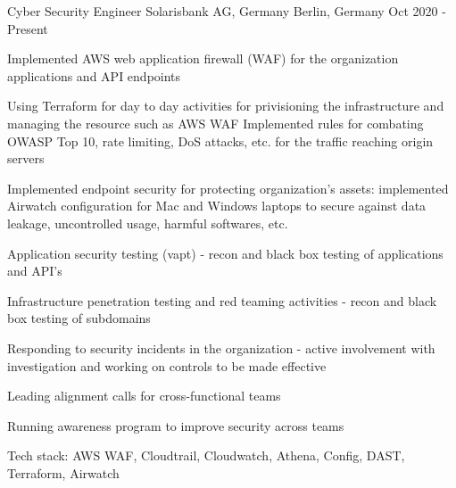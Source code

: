 \begin{cventries}
\cventry
    {Cyber Security Engineer} %
    {Solarisbank AG, Germany} %
    {Berlin, Germany} %
    {Oct 2020 - Present} %
    {
      \begin{cvitems} %
        \item {Implemented AWS web application firewall (WAF) for the organization applications and API endpoints
        \item Using Terraform for day to day activities for privisioning the infrastructure and managing the resource such as AWS WAF Implemented rules for combating OWASP Top 10, rate limiting, DoS attacks, etc. for the traffic reaching origin servers}
        \item {Implemented endpoint security for protecting organization's assets: implemented Airwatch configuration for Mac and Windows laptops to secure against data leakage, uncontrolled usage, harmful softwares, etc.}
        \item {Application security testing (vapt) - recon and black box testing of applications and API's}
        \item {Infrastructure penetration testing and red teaming activities  - recon and black box testing of subdomains}
        \item {Responding to security incidents in the organization - active involvement with investigation and working on controls to be made effective}
        \item {Leading alignment calls for cross-functional teams}
        \item {Running awareness program to improve security across teams}
        \item {Tech stack: AWS WAF, Cloudtrail, Cloudwatch, Athena, Config, DAST, Terraform, Airwatch}
      \end{cvitems}
    }


\end{cventries}
